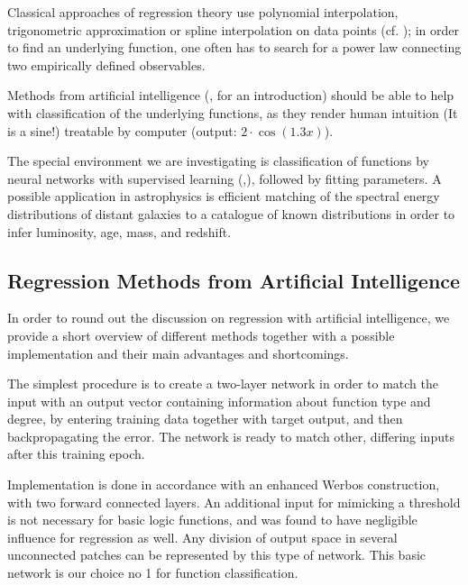 \documentclass[useAMS,usenatbib]{mn2e}
\begin{document}
Classical approaches of regression theory use polynomial
interpolation, trigonometric approximation or spline interpolation on
data points (cf. \cite{Quarteroni2002}); in order to find an underlying
function, one often has to search for a power law connecting two
empirically defined observables.
 
Methods from artificial intelligence (\cite{Laemmel2004},
\cite{Rojas1996} for an introduction) should be able to help with
classification of the underlying functions, as they render human
intuition (It is a sine!) treatable by computer (output:
$2\cdot\cos(1.3 x)$).

The special environment we are investigating is classification of
functions by neural networks with supervised learning
(\cite{Jones1990},\cite{Poggio1990}), followed by fitting
parameters. A possible application in astrophysics is efficient
matching of the spectral energy distributions of distant galaxies to a
catalogue of known distributions in order to infer luminosity, age,
mass, and redshift.

\subsection{Regression Methods from Artificial Intelligence}
In order to round out the discussion on regression with artificial
intelligence, we provide a short overview of different methods
together with a possible implementation and their main advantages and
shortcomings.

The simplest procedure is to create a two-layer network in order to
match the input with an output vector containing information about
function type and degree, by entering training data together with
target output, and then backpropagating the error. The network is
ready to match other, differing inputs after this training epoch.

Implementation is done in accordance with an enhanced Werbos
construction, with two forward connected layers. An additional input
for mimicking a threshold is not necessary for basic logic functions,
and was found to have negligible influence for regression as well. Any
division of output space in several unconnected patches can be
represented by this type of network. This basic network is our choice
no 1 for function classification.
\end{document}
